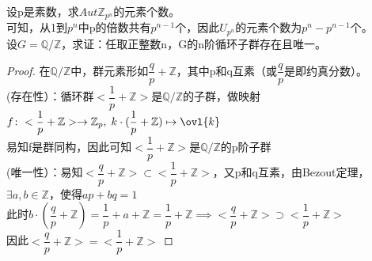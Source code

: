 设p是素数，求$Aut\mathbb{Z}_{p^n}$的元素个数。\\
可知，从1到$p^n$中p的倍数共有$p^{n-1}$个，因此$U_{p^n}$的元素个数为$p^n-p^{n-1}$个。\\
设$G=\mathbb{Q}/\mathbb{Z}$，求证：任取正整数n，G的n阶循环子群存在且唯一。
\begin{proof}
在$\mathbb{Q}/\mathbb{Z}$中，群元素形如$\dfrac{q}{p}+\mathbb{Z}$，其中p和q互素（或$\dfrac{q}{p}$是即约真分数）。\\
(存在性）：循环群$<\dfrac{1}{p}+\mathbb{Z}>$是$\mathbb{Q}/\mathbb{Z}$的子群，做映射$f\colon <\dfrac{1}{p}+\mathbb{Z}>\to \mathbb{Z}_p,\; k\cdot(\dfrac{1}{p}+\mathbb{Z})\mapsto \ovl{k}$\\
易知f是群同构，因此可知$<\dfrac{1}{p}+\mathbb{Z}>$是$\mathbb{Q}/\mathbb{Z}$的p阶子群\\
(唯一性）：易知$<\dfrac{q}{p}+\mathbb{Z}>\subset<\dfrac{1}{p}+\mathbb{Z}>$，又p和q互素，由Bezout定理，$\exists a,b\in \mathbb{Z}$，使得$ap+bq=1$\\
此时$b\cdot (\dfrac{q}{p}+\mathbb{Z})=\dfrac{1}{p}+a+\mathbb{Z}=\dfrac{1}{p}+\mathbb{Z}\implies <\dfrac{q}{p}+\mathbb{Z}>\supset<\dfrac{1}{p}+\mathbb{Z}>$\\
因此$<\dfrac{q}{p}+\mathbb{Z}>=<\dfrac{1}{p}+\mathbb{Z}>$
\end{proof}

